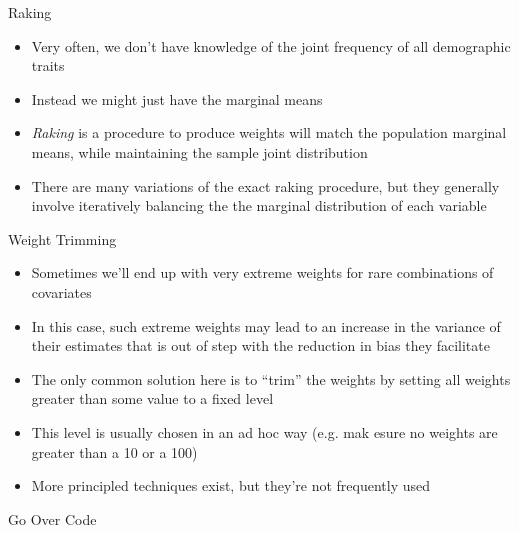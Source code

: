 \documentclass{beamer}
\begin{document}
\begin{frame}{Raking}
	\begin{itemize} 
		\item Very often, we don't have knowledge of the joint frequency of all demographic traits\pause 
		\item Instead we might just have the marginal means \pause 
		\item \textit{Raking} is a procedure to produce weights will match the population marginal means, while maintaining the sample joint distribution \pause
		\item There are many variations of the exact raking procedure, but they generally involve iteratively balancing the the marginal distribution of each variable
	\end{itemize}
\end{frame}


\begin{frame}{Weight Trimming}
	\begin{itemize}
		\item Sometimes we'll end up with very extreme weights for rare combinations of covariates \pause 
		\item In this case, such extreme weights may lead to an increase in the variance of their estimates that is out of step with the reduction in bias they facilitate \pause 
		\item The only common solution here is to ``trim'' the weights by setting all weights greater than some value to a fixed level\pause 
		\item This level is usually chosen in an ad hoc way (e.g. mak esure no weights are greater than a 10 or a 100)\pause 
		\item More principled techniques exist, but they're not frequently used
	\end{itemize}
\end{frame}


\begin{frame}{Go Over Code}
\end{frame}
\end{document}
